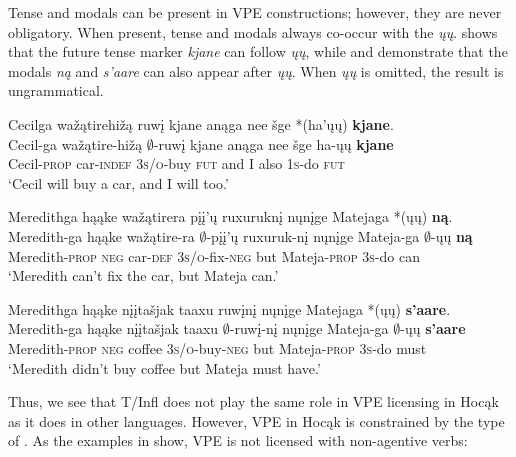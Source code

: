 \documentclass[output=paper]{LSP/langsci}
\begin{document}
Tense and modals can be present in VPE constructions; however, they are never obligatory. When present, tense and modals always co-occur with the  \emph{ųų}.  shows that the future tense marker \emph{kjane} can follow \emph{ųų}, while  and  demonstrate that the modals \emph{ną} and \emph{s'aare} can also appear after \emph{ųų}. When \emph{ųų} is omitted, the result is ungrammatical.

\renewcommand{\exfont}{\upshape} 

\ea\label{ex:johnson:19}
\ea\label{ex:johnson:19a} 
\glll Cecilga wažątirehižą ruwį kjane anąga nee šge *(ha'ųų) \textbf{kjane}.\\
Cecil-ga wažątire-hižą $\emptyset$-ruwį kjane anąga nee šge ha-ųų \textbf{kjane}\\
Cecil-\textsc{prop} car-\textsc{indef} \textsc{3s/o}-buy \textsc{fut} and I also \textsc{1s}-do \textsc{fut}\\
\trans `Cecil will buy a car, and I will too.' 
 
\ex\label{ex:johnson:19b} 
\glll Meredithga hąąke wažątirera {pįį'ų ruxuruknį} nųnįge Matejaga *(ųų) \textbf{ną}.\\
Meredith-ga hąąke wažątire-ra {$\emptyset$-pįį'ų ruxuruk-nį} nųnįge Mateja-ga {\db}$\emptyset$-ųų \textbf{ną}\\
Meredith-\textsc{prop} \textsc{neg} car-\textsc{def} \textsc{3s/o}-fix-\textsc{neg} but Mateja-\textsc{prop} \textsc{3s}-do can\\
\trans `Meredith can't fix the car, but Mateja can.'
 
\ex\label{ex:johnson:19c} 
\glll Meredithga hąąke {nįįtašjak taaxu} ruwįnį nųnįge Matejaga *(ųų) \textbf{s'aare}.\\ 
Meredith-ga hąąke {nįįtašjak taaxu} $\emptyset$-ruwį-nį nųnįge Mateja-ga {\db}$\emptyset$-ųų \textbf{s'aare}\\
Meredith-\textsc{prop} \textsc{neg} coffee \textsc{3s/o}-buy-\textsc{neg} but Mateja-\textsc{prop} \textsc{3s}-do must\\
\trans `Meredith didn't buy coffee but Mateja must have.' 
\z
\z
 
Thus, we see that T/Infl does not play the same role in VPE licensing in Hocąk as it does in other languages. However, VPE in Hocąk is constrained by the type of . As the examples in  show, VPE is not licensed with non-agentive verbs:
 
\end{document}
